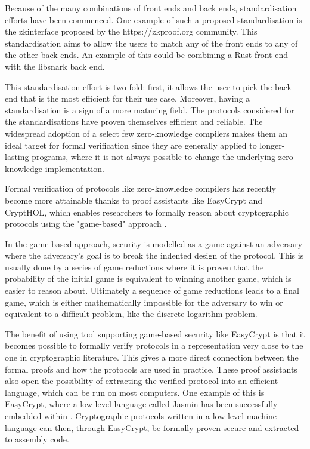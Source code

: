 Because of the many combinations of front ends and back ends, standardisation
efforts have been commenced.
One example of such a proposed standardisation is the zkinterface proposed by
the https://zkproof.org community.
This standardisation aims to allow the users to match any of the front ends to
any of the other back ends.
An example of this could be combining a Rust front end with the libsnark back end.

This standardisation effort is two-fold: first, it allows the user to pick the
back end that is the most efficient for their use case.
Moreover, having a standardisation is a sign of a more maturing field.
The protocols considered for the standardisations have proven themselves
efficient and reliable.
The widespread adoption of a select few zero-knowledge compilers makes them an
ideal target for formal verification since they are generally applied to
longer-lasting programs, where it is not always possible to change the
underlying zero-knowledge implementation.

\vspace{3mm}

Formal verification of protocols like zero-knowledge compilers has recently
become more attainable thanks to proof assistants like EasyCrypt and CryptHOL,
which enables researchers to formally reason about cryptographic protocols using the
"game-based" approach \cite{SOK:CAC}.

In the game-based approach, security is
modelled as a game against an adversary where the adversary's goal is to
break the indented design of the protocol.
This is usually done by a series of game reductions where it is proven that the
probability of the initial game is equivalent to winning another game, which is
easier to reason about.
Ultimately a sequence of game reductions leads to a final game, which is either
mathematically impossible for the adversary to win or equivalent to a
difficult problem, like the discrete logarithm problem.

The benefit of using tool supporting game-based security like EasyCrypt is that
it becomes possible to formally verify protocols in a representation very close
to the one in cryptographic literature. This gives a more direct connection between
the formal proofs and how the protocols are used in practice.
These proof assistants also open the possibility of extracting the verified
protocol into an efficient language, which can be run on most computers.
One example of this is EasyCrypt, where a low-level language called Jasmin has
been successfully embedded within \cite{easycrypt-jasmin}.
Cryptographic protocols written in a low-level machine language can
then, through EasyCrypt, be formally proven secure and extracted to assembly code.

